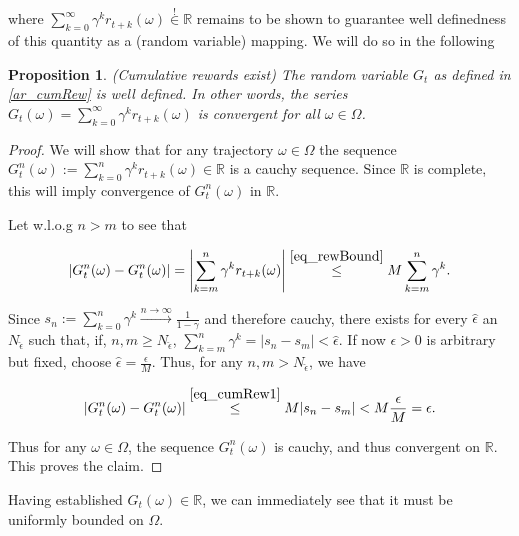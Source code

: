 \documentclass[11pt]{article} %
\newtheorem{prop}{Proposition}
\begin{document}
where $\sum_{k=0}^{\infty} \gamma^k r_{t+k}(\omega) \overset{!}{\in} \mathbb{R}$ remains to be shown to guarantee well definedness of this quantity as a (random variable) mapping. We will do so in the following

\begin{prop}\label{prop_cumRewEx}{(Cumulative rewards exist)}
	The random variable $G_t$ as defined in \ref{ar_cumRew} is well defined. In other words, the series $G_t(\omega) = \sum_{k=0}^{\infty} \gamma^k r_{t+k}(\omega)$ is convergent for all $\omega \in \Omega$.
\end{prop}

\begin{proof}
We will show that for any trajectory $\omega \in \Omega$ the sequence $G_t^n(\omega) := \sum_{k=0}^{n} \gamma^k r_{t+k}(\omega) \in \mathbb{R}$ is a cauchy sequence. Since $\mathbb{R}$ is complete, this will imply convergence of $G_t^n(\omega)$ in $\mathbb{R}$.

Let w.l.o.g $n > m$ to see that

	\begin{equation}\label{eq_cumRew1}
		\left| G_t^n(\omega) - G_t^n(\omega)\right| = \left| \sum_{k=m}^n \gamma^k r_{t+k}(\omega) \right| \overset{\ref{eq_rewBound}}{\le} M \sum_{k=m}^n \gamma^k.
	\end{equation}

Since $s_n := \sum_{k=0}^n \gamma^k \overset{n \rightarrow \infty}{\rightarrow} \frac{1}{1-\gamma}$ and therefore cauchy, there exists for every $\hat{\epsilon}$ an $N_{\hat{\epsilon}}$ such that, if, $n,m \ge N_{\hat{\epsilon}}$, $\sum_{k=m}^n \gamma^k = |s_n - s_m| < \hat{\epsilon}$. If now $\epsilon >0$ is arbitrary but fixed, choose $\hat{\epsilon} = \frac{\epsilon}{M}$. Thus, for any $n,m > N_{\hat{\epsilon}}$, we have

\begin{equation}\label{eq_cumRew2}
	\left|G_t^n(\omega) - G_t^n(\omega)\right| \overset{\ref{eq_cumRew1}}{\le} M |s_n - s_m| < M \frac{\epsilon}{M} = \epsilon.
\end{equation}

Thus for any $\omega \in \Omega$, the sequence $G_t^n(\omega)$ is cauchy, and thus convergent on $\mathbb{R}$. This proves the claim.

\end{proof}

Having established $G_t(\omega) \in \mathbb{R}$, we can immediately see that it must be uniformly bounded on $\Omega$.
\end{document}

